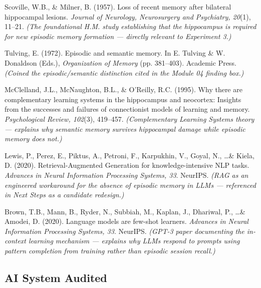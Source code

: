 \documentclass[12pt, a4paper]{article}
\begin{document}
\begin{enumerate}[leftmargin=0.4in, label={[\arabic*]}, resume]

\item Scoville, W.B., \& Milner, B. (1957). Loss of recent memory after bilateral hippocampal lesions. \textit{Journal of Neurology, Neurosurgery and Psychiatry, 20}(1), 11--21.
\textit{(The foundational H.M. study establishing that the hippocampus is required for new episodic memory formation — directly relevant to Experiment 3.)}

\item Tulving, E. (1972). Episodic and semantic memory. In E. Tulving \& W. Donaldson (Eds.), \textit{Organization of Memory} (pp. 381--403). Academic Press.
\textit{(Coined the episodic/semantic distinction cited in the Module 04 finding box.)}

\item McClelland, J.L., McNaughton, B.L., \& O'Reilly, R.C. (1995). Why there are complementary learning systems in the hippocampus and neocortex: Insights from the successes and failures of connectionist models of learning and memory. \textit{Psychological Review, 102}(3), 419--457.
\textit{(Complementary Learning Systems theory — explains why semantic memory survives hippocampal damage while episodic memory does not.)}

\item Lewis, P., Perez, E., Piktus, A., Petroni, F., Karpukhin, V., Goyal, N., \ldots \& Kiela, D. (2020). Retrieval-Augmented Generation for knowledge-intensive NLP tasks. \textit{Advances in Neural Information Processing Systems, 33}. NeurIPS.
\textit{(RAG as an engineered workaround for the absence of episodic memory in LLMs — referenced in Next Steps as a candidate redesign.)}

\item Brown, T.B., Mann, B., Ryder, N., Subbiah, M., Kaplan, J., Dhariwal, P., \ldots \& Amodei, D. (2020). Language models are few-shot learners. \textit{Advances in Neural Information Processing Systems, 33}. NeurIPS.
\textit{(GPT-3 paper documenting the in-context learning mechanism — explains why LLMs respond to prompts using pattern completion from training rather than episodic session recall.)}

\end{enumerate}

\subsection*{AI System Audited}
\end{document}
